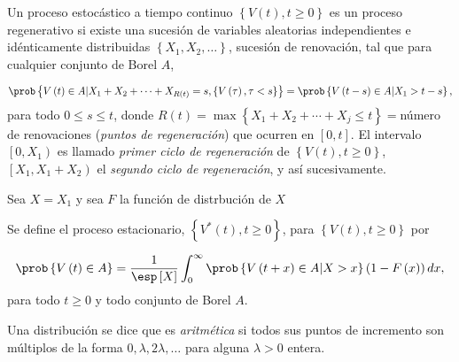 

Un proceso estoc\'astico a tiempo continuo $\left\{V\left(t\right),t\geq0\right\}$ es un proceso regenerativo si existe una sucesi\'on de variables aleatorias independientes e id\'enticamente distribuidas $\left\{X_{1},X_{2},\ldots\right\}$, sucesi\'on de renovaci\'on, tal que para cualquier conjunto de Borel $A$, 

\begin{eqnarray*}
\prob\left\{V\left(t\right)\in A|X_{1}+X_{2}+\cdots+X_{R\left(t\right)}=s,\left\{V\left(\tau\right),\tau<s\right\}\right\}=\prob\left\{V\left(t-s\right)\in A|X_{1}>t-s\right\},
\end{eqnarray*}
para todo $0\leq s\leq t$, donde $R\left(t\right)=\max\left\{X_{1}+X_{2}+\cdots+X_{j}\leq t\right\}=$n\'umero de renovaciones ({\emph{puntos de regeneraci\'on}}) que ocurren en $\left[0,t\right]$. El intervalo $\left[0,X_{1}\right)$ es llamado {\emph{primer ciclo de regeneraci\'on}} de $\left\{V\left(t \right),t\geq0\right\}$, $\left[X_{1},X_{1}+X_{2}\right)$ el {\emph{segundo ciclo de regeneraci\'on}}, y as\'i sucesivamente.

Sea $X=X_{1}$ y sea $F$ la funci\'on de distrbuci\'on de $X$


\begin{Def}
Se define el proceso estacionario, $\left\{V^{*}\left(t\right),t\geq0\right\}$, para $\left\{V\left(t\right),t\geq0\right\}$ por

\begin{eqnarray*}
\prob\left\{V\left(t\right)\in A\right\}=\frac{1}{\esp\left[X\right]}\int_{0}^{\infty}\prob\left\{V\left(t+x\right)\in A|X>x\right\}\left(1-F\left(x\right)\right)dx,
\end{eqnarray*} 
para todo $t\geq0$ y todo conjunto de Borel $A$.
\end{Def}

\begin{Def}
Una distribuci\'on se dice que es {\emph{aritm\'etica}} si todos sus puntos de incremento son m\'ultiplos de la forma $0,\lambda, 2\lambda,\ldots$ para alguna $\lambda>0$ entera.
\end{Def}


